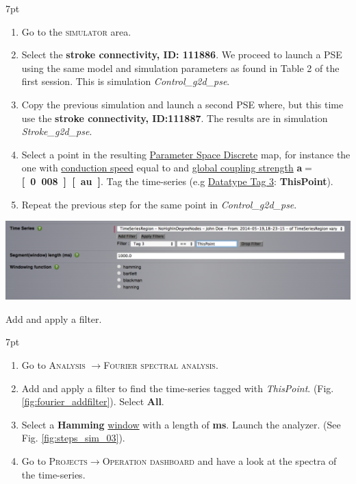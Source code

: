 \documentclass{tufte-handout}
\newenvironment{formal}{%
  \def\FrameCommand{%
    \hspace{1pt}%
    {\color{DarkBlue}\vrule width 2pt}%
    {\color{formalshade}\vrule width 4pt}%
    \colorbox{formalshade}%
  }%
  \MakeFramed{\advance\hsize-\width\FrameRestore}%
  \noindent\hspace{-4.55pt}%
  \begin{adjustwidth}{}{7pt}%
  \vspace{2pt}\vspace{2pt}%
}
{%
  \vspace{2pt}\end{adjustwidth}\endMakeFramed%
}
\newenvironment{simulation}{%
  \def\FrameCommand{%
    \hspace{1pt}%
    {\color{ForestGreen}\vrule width 2pt}%
    {\color{simulationshade}\vrule width 4pt}%
    \colorbox{simulationshade}%
  }%
  \MakeFramed{\advance\hsize-\width\FrameRestore}%
  \noindent\hspace{-4.55pt}%
  \begin{adjustwidth}{}{7pt}%
  \vspace{2pt}\vspace{2pt}%
}
{%
  \vspace{2pt}\end{adjustwidth}\endMakeFramed%
}
\begin{document}
\begin{simulation}
  \begin{enumerate}
  \item Go to the \textsc{simulator} area. 
  \item Select the \textbf{stroke connectivity, ID: 111886}. We proceed to launch a PSE using the same model and simulation parameters as found in Table 2 of the first session. This is simulation \textit{Control\_g2d\_pse}.
  \item Copy the previous simulation and launch a second PSE where, but this time use the \textbf{stroke connectivity, ID:111887}. The results are in simulation \textit{Stroke\_g2d\_pse}.
  \item Select a point in the resulting \underline{Parameter Space Discrete} map, for instance the one with \underline{conduction speed} equal to \textbf{} and \underline{global coupling strength} \textbf{a}$\mathbf{=}$\textbf{\unit[0.008][au]}. Tag the time-series (e.g \underline{Datatype Tag 3}: \textbf{ThisPoint}). 
  
 \item Repeat the previous step for the same point in \textit{Control\_g2d\_pse}.
 
  \end{enumerate}
\end{simulation}
 
 \begin{marginfigure}%
  \includegraphics[width=0.82\linewidth]{Handout_UI_ModellingStructuralLesions_FourierAddFilter}
    \caption{Add and apply a filter.}
  \label{fig:fourier_addfilter}
  \end{marginfigure}
 \begin{formal}
  \begin{enumerate}
  \item Go to \textsc{Analysis} $\rightarrow$\textsc{Fourier spectral analysis}. 
  \item Add and apply a filter to find the time-series tagged with \textit{ThisPoint}. (Fig. \ref{fig:fourier_addfilter}). Select \textbf{All}.
  \item Select a \textbf{Hamming} \underline{window} with a length of \textbf{\unit[500]{ms}}.  Launch the analyzer. (See Fig. \ref{fig:steps_sim_03}).
  \item Go to \textsc{Projects}$\rightarrow$\textsc{Operation dashboard} and have a look at the spectra of the time-series.
 \end{enumerate}
\end{formal}
\end{document}
